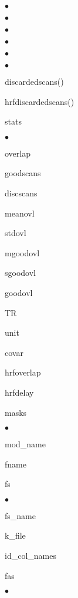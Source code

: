 \begin{list}{$\bullet$}
\begin{list}{$\bullet$}
\begin{list}{$\bullet$}
\begin{list}{$\bullet$}
\begin{list}{$\bullet$}
\begin{list}{$\bullet$}
                    \item discardedscans()
                    \item hrfdiscardedscans()
                    \end{list}
                \item stats
                    \begin{list}{$\bullet$}
                        {\setlength{\labelsep}{.2cm}\setlength{\itemindent}{0cm}\setlength{\leftmargin}{2.7cm}}
                    \item overlap
                    \item goodscans
                    \item discscans
                    \item meanovl
                    \item stdovl
                    \item mgoodovl
                    \item sgoodovl
                    \item goodovl
                    \end{list}
                \item TR
                \item unit
                \item covar
                \end{list}
            \end{list}
        \end{list}
    \item hrfoverlap
    \item hrfdelay
    \end{list}
\item masks
    \begin{list}{$\bullet$}
        {\setlength{\labelsep}{.2cm}\setlength{\itemindent}{0cm}\setlength{\leftmargin}{0.7cm}}
    \item mod\_name
    \item fname
    \end{list}
\item fs
    \begin{list}{$\bullet$}
        {\setlength{\labelsep}{.2cm}\setlength{\itemindent}{0cm}\setlength{\leftmargin}{0.7cm}}
    \item fs\_name
    \item k\_file
    \item id\_col\_names
    \item fas
        \begin{list}{$\bullet$}

\end{list}
\end{list}
\end{list}

